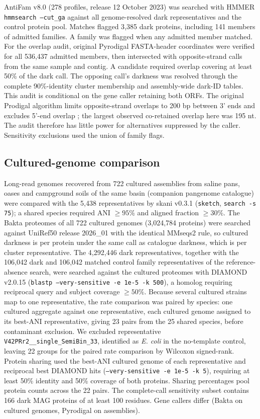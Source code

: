 \documentclass[11pt]{article}
\begin{document}
AntiFam v8.0 (278 profiles, release 12 October 2023) was searched with HMMER
\texttt{hmmsearch --cut\_ga} against all genome-resolved dark representatives and the control
protein pool. Matches flagged 3{,}385 dark proteins, including 141 members of admitted families.
A family was flagged when any admitted member matched. For the overlap audit, original Pyrodigal
FASTA-header coordinates were verified for all 536{,}437 admitted members, then intersected with
opposite-strand calls from the same sample and contig. A candidate required overlap covering at
least 50\% of the dark call. The opposing call's darkness was resolved through the complete
90\%-identity cluster membership and assembly-wide dark-ID tables. This audit is conditional on
the gene caller retaining both ORFs. The original Prodigal algorithm limits opposite-strand overlaps to 200 bp between 3' ends and excludes 5'-end overlap \citep{hyatt2010prodigal}; the largest observed co-retained overlap here was 195 nt. The audit therefore has little power for alternatives suppressed by the caller. Sensitivity exclusions used the union of family flags.

\subsection*{Cultured-genome comparison}
Long-read genomes recovered from 722 cultured assemblies from saline pans, oases and campground soils of the
same basin (companion pangenome catalogue) were compared with the 5{,}438 representatives by skani
v0.3.1 \citep{shaw2023skani} (\texttt{sketch}, \texttt{search -s 75}); a shared species required ANI $\geq 95\%$ and aligned
fraction $\geq 30\%$. The Bakta proteomes of all 722 cultured genomes (3{,}024{,}784 proteins) were
searched against UniRef50 release 2026\_01 with the identical MMseqs2 rule, so cultured darkness is per protein under
the same call as catalogue darkness, which is per cluster representative. The 4{,}292{,}446 dark
representatives, together with the 106{,}042 dark and 106{,}042 matched control family
representatives of the reference-absence search, were searched against the cultured proteomes with
DIAMOND v2.0.15 (\texttt{blastp --very-sensitive -e 1e-5 -k 500}), a homolog requiring reciprocal
query and subject coverage $\geq 50\%$. Because several cultured strains map to one representative,
the rate comparison was paired by species: one cultured aggregate against one representative, each
cultured genome assigned to its best-ANI representative, giving 23 pairs from the 25 shared species,
before contaminant exclusion. We excluded representative \texttt{V42PRr2\_\_single\_SemiBin\_33},
identified as \emph{E. coli} in the no-template control, leaving 22 groups for the paired rate
comparison by Wilcoxon signed-rank. Protein sharing used the best-ANI cultured genome of each
representative and reciprocal best DIAMOND hits (\texttt{--very-sensitive -e 1e-5 -k 5}),
requiring at least 50\% identity and 50\% coverage of both proteins. Sharing percentages pool
protein counts across the 22 pairs. The complete-call sensitivity subset contains 166 dark MAG
proteins of at least 100 residues. Gene callers differ (Bakta on cultured genomes, Pyrodigal
on assemblies).
\end{document}
